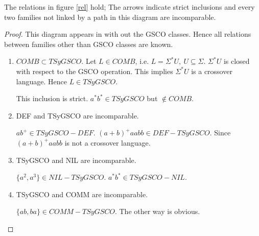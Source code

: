 \documentclass{llncs}
\newcommand{\sg}{\Sigma}
\begin{document}
\begin{theorem}
The relations in figure \ref{rel} hold; The arrows indicate strict
inclusions and every two families not linked by a path in this
diagram are incomparable.
\end{theorem}
\begin{proof}
This diagram appears in \cite{MPS} with out the GSCO classes.  Hence
all relations
 between families other than GSCO classes are known.
\begin{enumerate}
\item $COMB \subset TSyGSCO$. Let $L\in COMB$, i.e. $L=\sg^*U,~U\subseteq \sg$. $\sg^*U$
is closed with respect to the GSCO operation. This implies $\sg^*U$
is a crossover language. Hence $L\in TSyGSCO$.
\par This inclusion is strict. $a^*b^*\in TSyGSCO$ but $\notin COMB$.
\item DEF and TSyGSCO are incomparable.
\par $ab^+\in TSyGSCO-DEF$. $(a+b)^+aabb\in DEF-TSyGSCO$. Since $(a+b)^+aabb$ is
not a crossover language.
\item TSyGSCO and NIL are incomparable.
\par $\{a^2,a^3\}\in NIL-TSyGSCO$. $a^*b^*\in TSyGSCO-NIL$.
\item TSyGSCO and COMM are incomparable.
\par $\{ab,ba\}\in COMM-TSyGSCO$. The other way is obvious.
\end{enumerate}

\end{proof}
 
\end{document}
